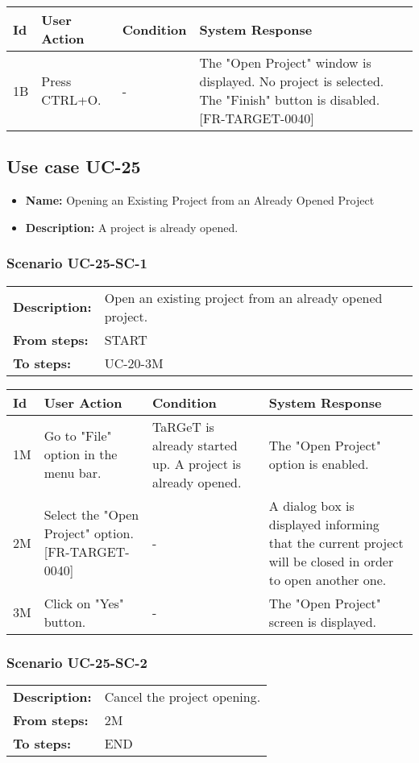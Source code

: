 \documentclass[a4paper,11pt]{article}
\newcommand{\bl}{\\ \hline}
\begin{document}
\begin{tabular}{|p{0.8in}|p{1.6in}|p{1.6in}|p{1.6in}|}
\hline
Id & User Action & Condition & System Response  \bl 
1B & Press CTRL+O. & - & The "Open Project" window is displayed. No project is selected. The "Finish" button is disabled. [FR-TARGET-0040] \bl 
\end{tabular}
\subsection*{Use case UC-25}
\begin{itemize}
\item {\bf Name: }Opening an Existing Project from an Already Opened Project
\item {\bf Description: }A project is already opened.
\end{itemize}
\subsubsection*{Scenario UC-25-SC-1}
\begin{tabular}{p{1in}p{4in}}
{\bf Description:} & Open an existing project from an already opened project. \\
{\bf From steps:} & START \\
{\bf To steps:} & UC-20-3M \\
\end{tabular}
 
\begin{tabular}{|p{0.8in}|p{1.6in}|p{1.6in}|p{1.6in}|}
\hline
Id & User Action & Condition & System Response  \bl 
1M & Go to "File" option in the menu bar. & TaRGeT is already started up. A project is already opened. & The "Open Project" option is enabled. \bl 
2M & Select the "Open Project" option. [FR-TARGET-0040] & - & A dialog box is displayed informing that the current project will be closed in order to open another one. \bl 
3M & Click on "Yes" button. & - & The "Open Project" screen is displayed. \bl 
\end{tabular}
\subsubsection*{Scenario UC-25-SC-2}
\begin{tabular}{p{1in}p{4in}}
{\bf Description:} & Cancel the project opening. \\
{\bf From steps:} & 2M \\
{\bf To steps:} & END \\
\end{tabular}
 
\end{document}
